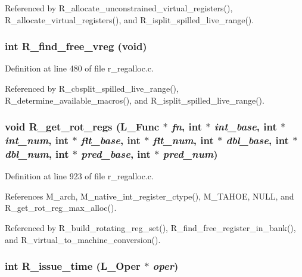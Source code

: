 Referenced by R\_\-allocate\_\-unconstrained\_\-virtual\_\-registers(), R\_\-allocate\_\-virtual\_\-registers(), and R\_\-isplit\_\-spilled\_\-live\_\-range().
\subsubsection{\setlength{\rightskip}{0pt plus 5cm}int R\_\-find\_\-free\_\-vreg (void)}\label{r__regalloc_8c_062ed80c2b26ee89b1f198cd17f77fcb}




Definition at line 480 of file r\_\-regalloc.c.

Referenced by R\_\-cbsplit\_\-spilled\_\-live\_\-range(), R\_\-determine\_\-available\_\-macros(), and R\_\-isplit\_\-spilled\_\-live\_\-range().
\subsubsection{\setlength{\rightskip}{0pt plus 5cm}void R\_\-get\_\-rot\_\-regs (L\_\-Func $\ast$ {\em fn}, int $\ast$ {\em int\_\-base}, int $\ast$ {\em int\_\-num}, int $\ast$ {\em flt\_\-base}, int $\ast$ {\em flt\_\-num}, int $\ast$ {\em dbl\_\-base}, int $\ast$ {\em dbl\_\-num}, int $\ast$ {\em pred\_\-base}, int $\ast$ {\em pred\_\-num})}\label{r__regalloc_8c_106a82114fd80f07788e824a8780634c}




Definition at line 923 of file r\_\-regalloc.c.

References M\_\-arch, M\_\-native\_\-int\_\-register\_\-ctype(), M\_\-TAHOE, NULL, and R\_\-get\_\-rot\_\-reg\_\-max\_\-alloc().

Referenced by R\_\-build\_\-rotating\_\-reg\_\-set(), R\_\-find\_\-free\_\-register\_\-in\_\-bank(), and R\_\-virtual\_\-to\_\-machine\_\-conversion().
\subsubsection{\setlength{\rightskip}{0pt plus 5cm}int R\_\-issue\_\-time (L\_\-Oper $\ast$ {\em oper})}\label{r__regalloc_8c_758bfe9fef58f203daa4d39e6b3b4c6e}




